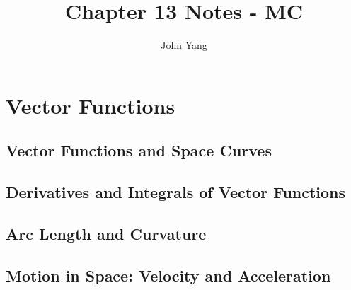 \documentclass{article}
\title{Chapter 13 Notes - MC} %
\author{John Yang}
\begin{document}
    \maketitle
    \tableofcontents
    \section{Vector Functions} %
    \subsection{Vector Functions and Space Curves} %
    \begin{outline}
        
    \end{outline}
    \subsection{Derivatives and Integrals of Vector Functions}
    \begin{outline}
        
    \end{outline}
    \subsection{Arc Length and Curvature}
    \begin{outline}
        
    \end{outline}
    \subsection{Motion in Space: Velocity and Acceleration}
    \begin{outline}
        
    \end{outline}
\end{document}

